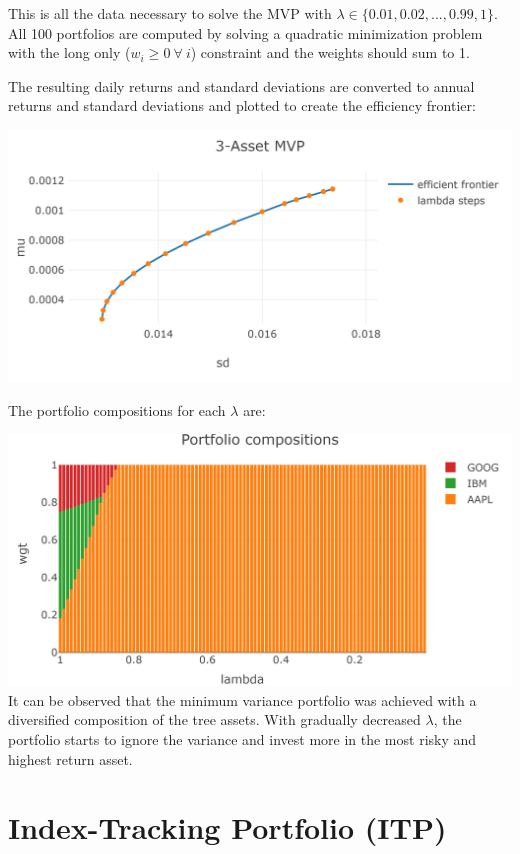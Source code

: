 \documentclass[
  oneside]{book}
\begin{document}
This is all the data necessary to solve the MVP with \(\lambda \in \{0.01, 0.02, ..., 0.99, 1\}\). All 100 portfolios are computed by solving a quadratic minimization problem with the long only (\(w_i \geq 0 \ \forall \ i\)) constraint and the weights should sum to 1.

The resulting daily returns and standard deviations are converted to annual returns and standard deviations and plotted to create the efficiency frontier:

\includegraphics{Master_Thesis_files/figure-latex/MVP_ex5-1.png}

The portfolio compositions for each \(\lambda\) are:

\includegraphics{Master_Thesis_files/figure-latex/MVP_ex6-1.png}
It can be observed that the minimum variance portfolio was achieved with a diversified composition of the tree assets. With gradually decreased \(\lambda\), the portfolio starts to ignore the variance and invest more in the most risky and highest return asset.

\hypertarget{index-tracking-portfolio-itp}{%
\section{Index-Tracking Portfolio (ITP)}\label{index-tracking-portfolio-itp}}
\end{document}
